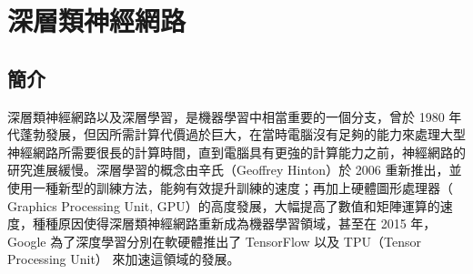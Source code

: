 \section{深層類神經網路}

\subsection{簡介}
深層類神經網路以及深層學習，是機器學習中相當重要的一個分支，曾於 1980 年代蓬勃發展，但因所需計算代價過於巨大，在當時電腦沒有足夠的能力來處理大型神經網路所需要很長的計算時間，直到電腦具有更強的計算能力之前，神經網路的研究進展緩慢。深層學習的概念由辛氏（Geoffrey Hinton）於 2006 重新推出，並使用一種新型的訓練方法，能夠有效提升訓練的速度；再加上硬體圖形處理器（ Graphics Processing Unit, GPU）的高度發展，大幅提高了數值和矩陣運算的速度，種種原因使得深層類神經網路重新成為機器學習領域，甚至在 2015 年， Google 為了深度學習分別在軟硬體推出了 TensorFlow \cite{tensorflow2015-whitepaper} 以及 TPU（Tensor Processing Unit） \cite{jouppi2017datacenter} 來加速這領域的發展。

